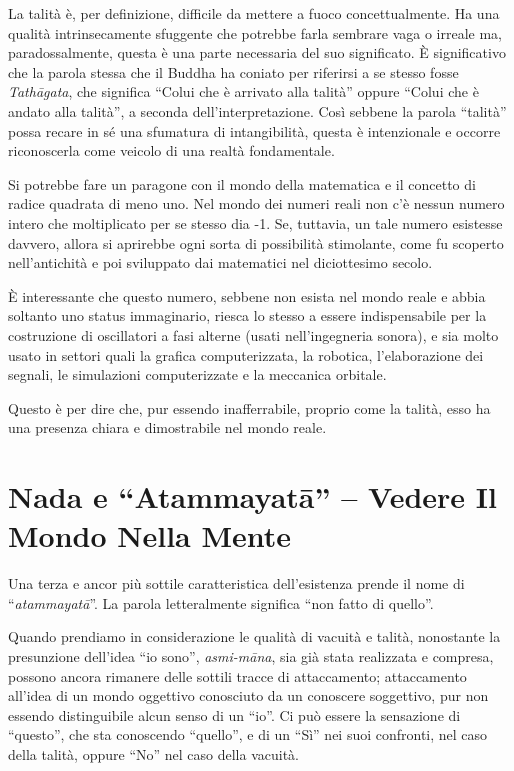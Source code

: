La talità è, per definizione, difficile da mettere a fuoco
concettualmente. Ha una qualità intrinsecamente sfuggente che potrebbe
farla sembrare vaga o irreale ma, paradossalmente, questa è una parte
necessaria del suo significato. È significativo che la parola stessa che
il Buddha ha coniato per riferirsi a se stesso fosse \emph{Tathāgata},
che significa ``Colui che è arrivato alla talità'' oppure ``Colui che è
andato alla talità'', a seconda dell'interpretazione. Così sebbene la
parola ``talità'' possa recare in sé una sfumatura di intangibilità,
questa è intenzionale e occorre riconoscerla come veicolo di una realtà
fondamentale.

Si potrebbe fare un paragone con il mondo della matematica e il concetto
di radice quadrata di meno uno. Nel mondo dei numeri reali non c'è
nessun numero intero che moltiplicato per se stesso dia -1. Se,
tuttavia, un tale numero esistesse davvero, allora si aprirebbe ogni
sorta di possibilità stimolante, come fu scoperto nell'antichità e poi
sviluppato dai matematici nel diciottesimo secolo.

È interessante che questo numero, sebbene non esista nel mondo reale e
abbia soltanto uno status immaginario, riesca lo stesso a essere
indispensabile per la costruzione di oscillatori a fasi alterne (usati
nell'ingegneria sonora), e sia molto usato in settori quali la grafica
computerizzata, la robotica, l'elaborazione dei segnali, le simulazioni
computerizzate e la meccanica orbitale.

Questo è per dire che, pur essendo inafferrabile, proprio come la
talità, esso ha una presenza chiara e dimostrabile nel mondo reale.\cite{imaginary}

\section{Nada e ``Atammayatā'' -- Vedere Il Mondo Nella Mente}

Una terza e ancor più sottile caratteristica dell'esistenza prende il
nome di ``\emph{atammayatā}''. La parola letteralmente significa ``non
fatto di quello''.

Quando prendiamo in considerazione le qualità di vacuità e talità,
nonostante la presunzione dell'idea ``io sono'', \emph{asmi-māna}, sia
già stata realizzata e compresa, possono ancora rimanere delle sottili
tracce di attaccamento; attaccamento all'idea di un mondo oggettivo
conosciuto da un conoscere soggettivo, pur non essendo distinguibile
alcun senso di un ``io''. Ci può essere la sensazione di ``questo'', che
sta conoscendo ``quello'', e di un ``Sì'' nei suoi confronti, nel caso
della talità, oppure ``No'' nel caso della vacuità.

